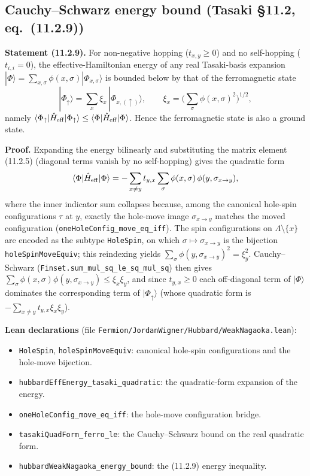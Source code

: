 \documentclass[a4paper,11pt]{article}
\begin{document}
\subsection{Cauchy--Schwarz energy bound (Tasaki §11.2, eq.~(11.2.9))}
\label{subsec:hubbard-weak-nagaoka}

\noindent\textbf{Statement (11.2.9).}
For non-negative hopping (\(t_{x,y} \geq 0\)) and no self-hopping
(\(t_{i,i}=0\)), the effective-Hamiltonian energy of any real Tasaki-basis
expansion \(|\Phi\rangle = \sum_{x,\sigma}\phi(x,\sigma)|\Phi_{x,\sigma}\rangle\)
is bounded below by that of the ferromagnetic state
\[
  |\Phi_\uparrow\rangle = \sum_x \xi_x\, |\Phi_{x,(\uparrow)}\rangle,
  \qquad \xi_x = \Big(\sum_\sigma \phi(x,\sigma)^2\Big)^{1/2},
\]
namely \(\langle \Phi_\uparrow | \hat H_{\rm eff} | \Phi_\uparrow\rangle
\leq \langle \Phi | \hat H_{\rm eff} | \Phi\rangle\). Hence the ferromagnetic
state is also a ground state.

\medskip
\noindent\textbf{Proof.}
Expanding the energy bilinearly and substituting the matrix element (11.2.5)
(diagonal terms vanish by no self-hopping) gives the quadratic form
\[
  \langle \Phi | \hat H_{\rm eff} | \Phi\rangle
    = -\sum_{x \neq y} t_{y,x} \sum_\sigma \phi(x,\sigma)\,
      \phi(y,\sigma_{x\to y}),
\]
where the inner indicator sum collapses because, among the canonical hole-spin
configurations \(\tau\) at \(y\), exactly the hole-move image \(\sigma_{x\to y}\)
matches the moved configuration (\texttt{oneHoleConfig\_move\_eq\_iff}). The
spin configurations on \(\Lambda\setminus\{x\}\) are encoded as the subtype
\texttt{HoleSpin}, on which \(\sigma\mapsto\sigma_{x\to y}\) is the bijection
\texttt{holeSpinMoveEquiv}; this reindexing yields
\(\sum_\sigma \phi(y,\sigma_{x\to y})^2 = \xi_y^2\). Cauchy--Schwarz
(\texttt{Finset.sum\_mul\_sq\_le\_sq\_mul\_sq}) then gives
\(\sum_\sigma \phi(x,\sigma)\phi(y,\sigma_{x\to y}) \leq \xi_x \xi_y\), and since
\(t_{y,x}\geq 0\) each off-diagonal term of \(|\Phi\rangle\) dominates the
corresponding term of \(|\Phi_\uparrow\rangle\) (whose quadratic form is
\(-\sum_{x\neq y} t_{y,x}\xi_x\xi_y\)).

\medskip
\noindent\textbf{Lean declarations}
(file \texttt{Fermion/JordanWigner/Hubbard/WeakNagaoka.lean}):
\begin{itemize}
  \item \texttt{HoleSpin}, \texttt{holeSpinMoveEquiv}: canonical hole-spin
    configurations and the hole-move bijection.
  \item \texttt{hubbardEffEnergy\_tasaki\_quadratic}: the quadratic-form
    expansion of the energy.
  \item \texttt{oneHoleConfig\_move\_eq\_iff}: the hole-move configuration
    bridge.
  \item \texttt{tasakiQuadForm\_ferro\_le}: the Cauchy--Schwarz bound on the
    real quadratic form.
  \item \texttt{hubbardWeakNagaoka\_energy\_bound}: the (11.2.9) energy
    inequality.
\end{itemize}
\end{document}
